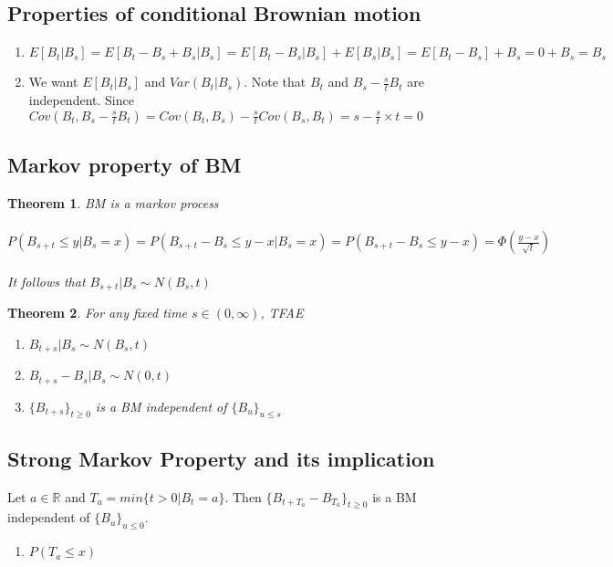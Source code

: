 \documentclass[12pt]{article}
\newtheorem{theorem}{Theorem}
\begin{document}
\subsection{Properties of conditional Brownian motion}

\begin{enumerate}
    \item $E[B_t|B_s] = E[B_t-B_s+B_s|B_s] = E[B_t-B_s|B_s] + E[B_s|B_s] = E[B_t-B_s] + B_s = 0 + B_s = B_s$
    \item We want $E[B_t|B_s]$ and $Var(B_t|B_s)$. Note that $B_t$ and $B_s - \frac{s}{t}B_t$ are independent. Since $Cov(B_t, B_s - \frac{s}{t}B_t) = Cov(B_t, B_s) - \frac{s}{t}Cov(B_s,B_t) = s - \frac{s}{t}\times t = 0$
\end{enumerate}

\subsection{Markov property of BM}

\begin{theorem}
    BM is a markov process
    \\
    \\
    \begin{math}
    P(B_{s+t}\leq y | B_s = x) = P(B_{s+t} - B_s \leq y - x | B_s = x)
    =P(B_{s+t} - B_s \leq y - x)
    =\Phi (\frac{y-x}{\sqrt{t}})
    \end{math}
    \\
    \\It follows that $B_{s+t}|B_s \sim N(B_s,t)$
\end{theorem}

\begin{theorem}
    For any fixed time $s \in (0, \infty)$, TFAE
    \begin{enumerate}
        \item $B_{t+s} | B_s \sim N(B_s, t)$
        \item $B_{t+s} - B_s | B_s \sim N(0,t)$
        \item $\{B_{t+s}\}_{t\geq 0}$ is a BM independent of $\{B_u\}_{u \leq s}$
    \end{enumerate}
\end{theorem}

\subsection{Strong Markov Property and its implication}

Let $a \in \mathbb{R}$ and $T_a = min\{t > 0 | B_t = a\}$. Then $\{B_{t+T_a} - B_{T_a}\}_{t\geq 0}$ is a BM independent of $\{B_u\}_{u\leq 0}$.

\begin{enumerate}
    \item $P(T_a \leq x)$
\end{enumerate}
\end{document}

